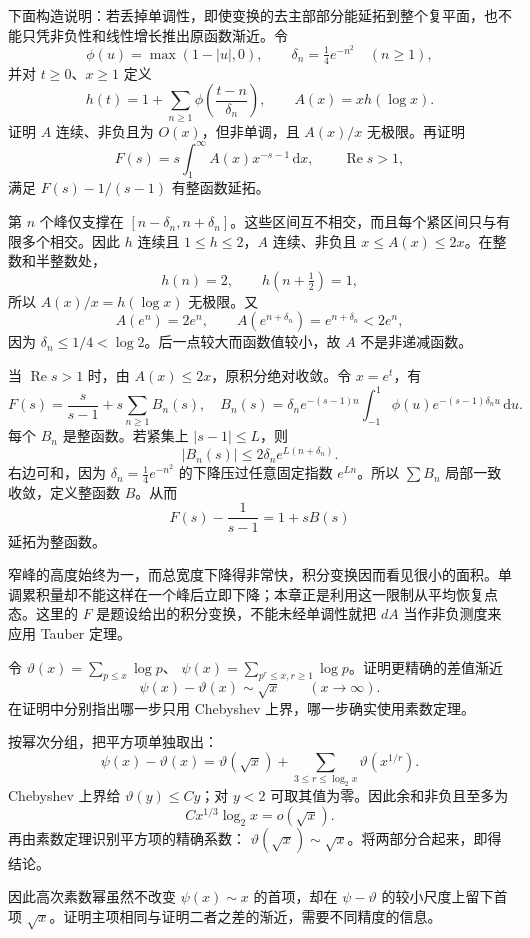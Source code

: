 \begin{exercise}\label{b3:ex:27-5}
下面构造说明：若丢掉单调性，即使变换的去主部部分能延拓到整个复平面，也不能只凭非负性和线性增长推出原函数渐近。令
\[
 \phi(u)=\max(1-|u|,0),\qquad
 \delta_n=\tfrac14e^{-n^2}\quad(n\ge1),
\]
并对 \(t\ge0\)、\(x\ge1\) 定义
\[
 h(t)=1+\sum_{n\ge1}\phi\!\left(\frac{t-n}{\delta_n}\right),
 \qquad A(x)=x h(\log x).
\]
证明 \(A\) 连续、非负且为 \(O(x)\)，但非单调，且 \(A(x)/x\) 无极限。再证明
\[
 F(s)=s\int_1^\infty A(x)x^{-s-1}\,\mathrm dx,
 \qquad \operatorname{Re}s>1,
\]
满足 \(F(s)-1/(s-1)\) 有整函数延拓。
\end{exercise}
\begin{solution}
第 \(n\) 个峰仅支撑在 \([n-\delta_n,n+\delta_n]\)。这些区间互不相交，而且每个紧区间只与有限多个相交。因此 \(h\) 连续且 \(1\le h\le2\)，\(A\) 连续、非负且 \(x\le A(x)\le2x\)。在整数和半整数处，
\[
 h(n)=2,\qquad h(n+\tfrac12)=1,
\]
所以 \(A(x)/x=h(\log x)\) 无极限。又
\[
 A(e^n)=2e^n,\qquad A(e^{n+\delta_n})=e^{n+\delta_n}<2e^n,
\]
因为 \(\delta_n\le1/4<\log2\)。后一点较大而函数值较小，故 \(A\) 不是非递减函数。

当 \(\operatorname{Re}s>1\) 时，由 \(A(x)\le2x\)，原积分绝对收敛。令 \(x=e^t\)，有
\[
 F(s)=\frac{s}{s-1}+s\sum_{n\ge1}B_n(s),
 \quad
 B_n(s)=\delta_n e^{-(s-1)n}
     \int_{-1}^1\phi(u)e^{-(s-1)\delta_nu}\,\mathrm du.
\]
每个 \(B_n\) 是整函数。若紧集上 \(|s-1|\le L\)，则
\[
 |B_n(s)|\le2\delta_n e^{L(n+\delta_n)}.
\]
右边可和，因为 \(\delta_n=\tfrac14e^{-n^2}\) 的下降压过任意固定指数 \(e^{Ln}\)。所以 \(\sum B_n\) 局部一致收敛，定义整函数 \(B\)。从而
\[
 F(s)-\frac1{s-1}=1+sB(s)
\]
延拓为整函数。

窄峰的高度始终为一，而总宽度下降得非常快，积分变换因而看见很小的面积。单调累积量却不能这样在一个峰后立即下降；本章正是利用这一限制从平均恢复点态。这里的 \(F\) 是题设给出的积分变换，不能未经单调性就把 \(dA\) 当作非负测度来应用 Tauber 定理。
\end{solution}

\begin{exercise}\label{b3:ex:27-6}
令 \(\vartheta(x)=\sum_{p\le x}\log p\)、
\(\psi(x)=\sum_{p^r\le x,r\ge1}\log p\)。证明更精确的差值渐近
\[
 \psi(x)-\vartheta(x)\sim\sqrt x\qquad(x\to\infty).
\]
在证明中分别指出哪一步只用 Chebyshev 上界，哪一步确实使用素数定理。
\end{exercise}
\begin{solution}
按幂次分组，把平方项单独取出：
\[
 \psi(x)-\vartheta(x)
 =\vartheta(\sqrt x)
       +\sum_{3\le r\le\log_2x}\vartheta(x^{1/r}).
\]
Chebyshev 上界给 \(\vartheta(y)\le Cy\)；对 \(y<2\) 可取其值为零。因此余和非负且至多为
\[
 Cx^{1/3}\log_2x=o(\sqrt x).
\]
再由素数定理识别平方项的精确系数：
\(\vartheta(\sqrt x)\sim\sqrt x\)。将两部分合起来，即得结论。

因此高次素数幂虽然不改变 \(\psi(x)\sim x\) 的首项，却在 \(\psi-\vartheta\) 的较小尺度上留下首项 \(\sqrt x\)。证明主项相同与证明二者之差的渐近，需要不同精度的信息。
\end{solution}

